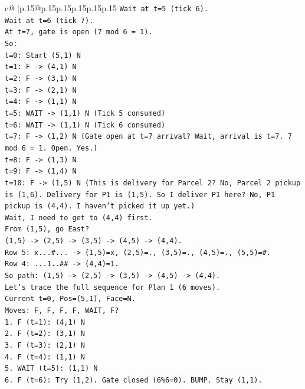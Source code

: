 \documentclass{article}
\begin{document}
{\begin{supertabular}{c@{$\;$}|p{.15\linewidth}@{}p{.15\linewidth}p{.15\linewidth}p{.15\linewidth}p{.15\linewidth}p{.15\linewidth}}
{{{\texttt{Wait at t=5 (tick 6).} \\
\texttt{Wait at t=6 (tick 7).} \\
\texttt{At t=7, gate is open (7 mod 6 = 1).} \\
\texttt{So:} \\
\texttt{t=0: Start (5,1) N} \\
\texttt{t=1: F {-}> (4,1) N} \\
\texttt{t=2: F {-}> (3,1) N} \\
\texttt{t=3: F {-}> (2,1) N} \\
\texttt{t=4: F {-}> (1,1) N} \\
\texttt{t=5: WAIT {-}> (1,1) N (Tick 5 consumed)} \\
\texttt{t=6: WAIT {-}> (1,1) N (Tick 6 consumed)} \\
\texttt{t=7: F {-}> (1,2) N (Gate open at t=7 arrival? Wait, arrival is t=7. 7 mod 6 = 1. Open. Yes.)} \\
\texttt{t=8: F {-}> (1,3) N} \\
\texttt{t=9: F {-}> (1,4) N} \\
\texttt{t=10: F {-}> (1,5) N (This is delivery for Parcel 2? No, Parcel 2 pickup is (1,6). Delivery for P1 is (1,5). So I deliver P1 here? No, P1 pickup is (4,4). I haven't picked it up yet.)} \\
\texttt{Wait, I need to get to (4,4) first.} \\
\texttt{From (1,5), go East?} \\
\texttt{(1,5) {-}> (2,5) {-}> (3,5) {-}> (4,5) {-}> (4,4).} \\
\texttt{Row 5: x...\#... {-}> (1,5)=x, (2,5)=., (3,5)=., (4,5)=., (5,5)=\#.} \\
\texttt{Row 4: ...1..\#\# {-}> (4,4)=1.} \\
\texttt{So path: (1,5) {-}> (2,5) {-}> (3,5) {-}> (4,5) {-}> (4,4).} \\
\texttt{Let's trace the full sequence for Plan 1 (6 moves).} \\
\texttt{Current t=0, Pos=(5,1), Face=N.} \\
\texttt{Moves: F, F, F, F, WAIT, F?} \\
\texttt{1. F (t=1): (4,1) N} \\
\texttt{2. F (t=2): (3,1) N} \\
\texttt{3. F (t=3): (2,1) N} \\
\texttt{4. F (t=4): (1,1) N} \\
\texttt{5. WAIT (t=5): (1,1) N} \\
\texttt{6. F (t=6): Try (1,2). Gate closed (6\%6=0). BUMP. Stay (1,1).} \\
}}}
\end{supertabular}}
\end{document}
